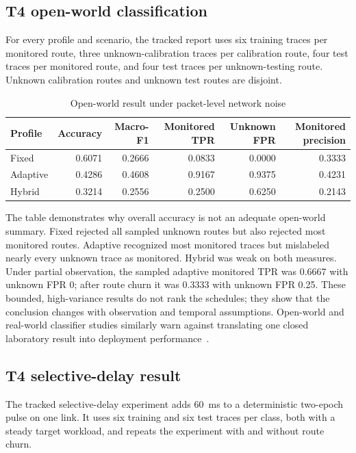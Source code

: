 \documentclass[11pt,oneside]{article}
\begin{document}
\subsection{T4 open-world classification}

For every profile and scenario, the tracked report uses six training traces per monitored route, three unknown-calibration traces per calibration route, four test traces per monitored route, and four test traces per unknown-testing route. Unknown calibration routes and unknown test routes are disjoint.

\begin{table}[ht]
\centering
\caption{Open-world result under packet-level network noise}
\label{tab:t4openworld}
\begin{tabular}{@{}lrrrrr@{}}
\toprule
Profile & Accuracy & Macro-F1 & Monitored TPR & Unknown FPR & Monitored precision \\
\midrule
Fixed & 0.6071 & 0.2666 & 0.0833 & 0.0000 & 0.3333 \\
Adaptive & 0.4286 & 0.4608 & 0.9167 & 0.9375 & 0.4231 \\
Hybrid & 0.3214 & 0.2556 & 0.2500 & 0.6250 & 0.2143 \\
\bottomrule
\end{tabular}
\end{table}

The table demonstrates why overall accuracy is not an adequate open-world summary. Fixed rejected all sampled unknown routes but also rejected most monitored routes. Adaptive recognized most monitored traces but mislabeled nearly every unknown trace as monitored. Hybrid was weak on both measures. Under partial observation, the sampled adaptive monitored TPR was 0.6667 with unknown FPR 0; after route churn it was 0.3333 with unknown FPR 0.25. These bounded, high-variance results do not rank the schedules; they show that the conclusion changes with observation and temporal assumptions. Open-world and real-world classifier studies similarly warn against translating one closed laboratory result into deployment performance~\cite{onlinewf,gtt23,realitycheck2026}.

\subsection{T4 selective-delay result}

The tracked selective-delay experiment adds 60~ms to a deterministic two-epoch pulse on one link. It uses six training and six test traces per class, both with a steady target workload, and repeats the experiment with and without route churn.
\end{document}
